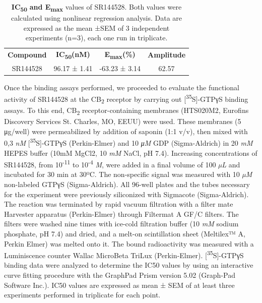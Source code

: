\documentclass[empirical, authordate]{jote-new-article}
\begin{document}
\begin{table}[t]
  \begin{fullwidth}
    \caption{\textbf{IC}\textsubscript{\textbf{50}}\textbf{ and E}\textsubscript{\textbf{max}}\textsubscript{ }values of SR144528. Both values were calculated using nonlinear regression analysis. Data are expressed as the mean ±SEM of 3 independent experiments (n=3), each one run in triplicate.}
    \label{tab:2}
    \begin{tabular}{c  c  c  c}
      \textbf{Compound } & \textbf{IC\textsubscript{50}(nM)} & \textbf{E\textsubscript{max}(\%) } & \textbf{Amplitude } \\
      SR144528           & 96.17 ± 1.41                      & -63.23 ± 3.14                      & 62.57               \\
    \end{tabular}
  \end{fullwidth}
\end{table}

Once the binding assays performed, we proceeded to evaluate the functional activity of SR144528 at the CB\textsubscript{2} receptor by carrying out [\textsuperscript{35}S]-GTPγS binding assays. To this end, CB\textsubscript{2} receptor-containing membranes (HTS020M2, Eurofins Discovery Services St. Charles, MO, EEUU) were used. These membranes (5 μg/well) were permeabilized by addition of saponin (1:1 v/v), then mixed with 0,3 \emph{nM} [\textsuperscript{35}S]-GTPγS (Perkin-Elmer) and 10 \emph{μM} GDP (Sigma-Aldrich) in 20 \emph{mM} HEPES buffer (10mM MgCl2, 10 \emph{mM} NaCl, pH 7.4). Increasing concentrations of SR144528, from 10\textsuperscript{-11} to 10\textsuperscript{-4} \emph{M}, were added in a final volume of 100 \emph{µL} and incubated for 30 min at 30ºC. The non-specific signal was measured with 10 \emph{µM} non-labeled GTPγS (Sigma-Aldrich). All 96-well plates and the tubes necessary for the experiment were previously siliconized with Sigmacote (Sigma-Aldrich). The reaction was terminated by rapid vacuum filtration with a filter mate Harvester apparatus (Perkin-Elmer) through Filtermat A GF/C filters. The filters were washed nine times with ice-cold filtration buffer (10 \emph{mM} sodium phosphate, pH 7.4) and dried, and a melt-on scintillation sheet (Meltilex™ A, Perkin Elmer) was melted onto it. The bound radioactivity was measured with a Luminiscence counter Wallac MicroBeta TriLux (Perkin-Elmer). [\textsuperscript{35}S]-GTPγS binding data were analyzed to determine the IC50 values by using an interactive curve fitting procedure with the GraphPad Prism version 5.02 (Graph-Pad Software Inc.). IC50 values are expressed as mean ± SEM of at least three experiments performed in triplicate for each point.
\end{document}
